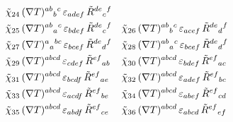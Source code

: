 \documentclass[12pt,a4paper]{article}
\newcommand{\Rt}{\tilde{R}}         %
\newcommand{\del}{\nabla}            %
\newcommand{\eps}{\varepsilon}       %
\begin{document}
{\begin{align}
  \tilde{\chi}_{24}&\, (\del T)^{ab}{}_{b}{}^{c}\,\eps_{adef}\,\Rt^{de}{}_{c}{}^{f}  \notag\\
  \tilde{\chi}_{25}&\, (\del T)^{ab}{}_{a}{}^{c}\,\eps_{bdef}\,\Rt^{de}{}_{c}{}^{f}  &
  \tilde{\chi}_{26}&\, (\del T)^{ab}{}_{b}{}^{c}\,\eps_{acef}\,\Rt^{de}{}_{d}{}^{f}  \notag\\
  \tilde{\chi}_{27}&\, (\del T)^{a}{}_{a}{}^{bc}\,\eps_{bcef}\,\Rt^{de}{}_{d}{}^{f}  &
  \tilde{\chi}_{28}&\, (\del T)^{ab}{}_{a}{}^{c}\,\eps_{bcef}\,\Rt^{de}{}_{d}{}^{f}  \notag\\
  \tilde{\chi}_{29}&\, (\del T)^{abcd}\,\eps_{cdef}\,\Rt^{ef}{}_{ab}  &
  \tilde{\chi}_{30}&\, (\del T)^{abcd}\,\eps_{bdef}\,\Rt^{ef}{}_{ac}  \notag\\
  \tilde{\chi}_{31}&\, (\del T)^{abcd}\,\eps_{bcdf}\,\Rt^{ef}{}_{ae}  &
  \tilde{\chi}_{32}&\, (\del T)^{abcd}\,\eps_{adef}\,\Rt^{ef}{}_{bc}  \notag\\
  \tilde{\chi}_{33}&\, (\del T)^{abcd}\,\eps_{acdf}\,\Rt^{ef}{}_{be}  &
  \tilde{\chi}_{34}&\, (\del T)^{abcd}\,\eps_{abef}\,\Rt^{ef}{}_{cd}  \notag\\
  \tilde{\chi}_{35}&\, (\del T)^{abcd}\,\eps_{abdf}\,\Rt^{ef}{}_{ce}  &
  \tilde{\chi}_{36}&\, (\del T)^{abcd}\,\eps_{abcd}\,\Rt^{ef}{}_{ef}
  \label{eq:eps_r_dt_explicit}
\end{align}
}
\end{document}
